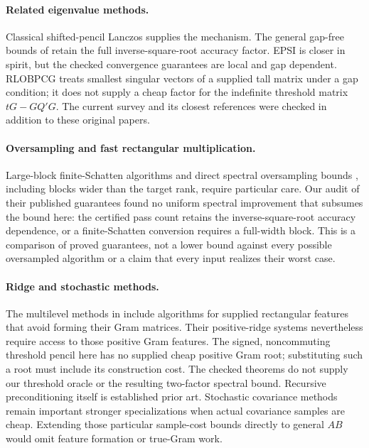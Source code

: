 \documentclass[11pt]{article}
\begin{document}
\paragraph{Related eigenvalue methods.}
Classical shifted-pencil Lanczos \cite{templates} supplies the mechanism.
The general gap-free bounds of \cite{genev} retain the full inverse-square-root
accuracy factor. EPSI \cite{epsi} is closer in spirit, but the checked
convergence guarantees are local and gap dependent. RLOBPCG \cite{rlobpcg}
treats smallest singular vectors of a supplied tall matrix under a gap
condition; it does not supply a cheap factor for the indefinite threshold
matrix \(tG-GQ'G\). The current survey \cite{survey} and its closest
references were checked in addition to these original papers.

\paragraph{Oversampling and fast rectangular multiplication.}
Large-block finite-Schatten algorithms \cite{kw} and direct spectral
oversampling bounds \cite{tropp}, including blocks wider than the target
rank, require particular care. Our audit of their published guarantees
found no uniform spectral improvement that subsumes the bound here: the
certified pass count retains the inverse-square-root accuracy dependence,
or a finite-Schatten conversion requires a full-width block. This is a
comparison of proved guarantees, not a lower bound against every possible
oversampled algorithm or a claim that every input realizes their worst case.

\paragraph{Ridge and stochastic methods.}
The multilevel methods in \cite{msp} include algorithms for supplied
rectangular features that avoid forming their Gram matrices. Their
positive-ridge systems nevertheless require access to those positive
Gram features. The signed, noncommuting threshold pencil here has no
supplied cheap positive Gram root; substituting such a root must include
its construction cost. The checked theorems do not supply our threshold
oracle or the resulting two-factor spectral bound. Recursive
preconditioning itself is established prior art.
Stochastic covariance methods \cite{garber} remain important stronger
specializations when actual covariance samples are cheap. Extending those
particular sample-cost bounds directly to general \(AB\) would omit
feature formation or true-Gram work.
\end{document}
